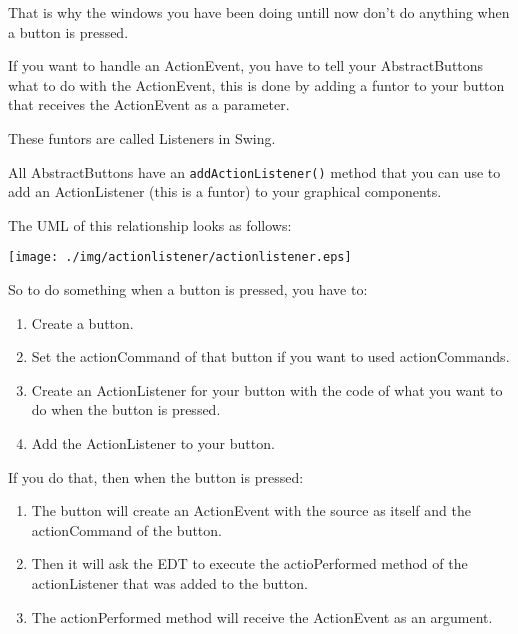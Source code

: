 \documentclass[a4paper, 9pt]{extarticle}
\begin{document}
That is why the windows you have been doing untill now don't do anything when a button is pressed.

If you want to handle an ActionEvent, you have to tell your AbstractButtons
what to do with the ActionEvent, this is done by adding a funtor to your button
that receives the ActionEvent as a parameter.

These funtors are called Listeners in Swing.

All AbstractButtons have an \texttt{addActionListener()} method that you can use to
add an ActionListener (this is a funtor) to your graphical components.

The UML of this relationship looks as follows:

\begin{center}
  \texttt{[image: ./img/actionlistener/actionlistener.eps]}
\end{center}

So to do something when a button is pressed, you have to:

\begin{enumerate}

  \item Create a button.

  \item Set the actionCommand of that button if you want to used actionCommands.

  \item Create an ActionListener for your button with the code of what you want to do when the button is pressed.

  \item Add the ActionListener to your button.

\end{enumerate}

If you do that, then when the button is pressed:

\begin{enumerate}

  \item The button will create an ActionEvent with the source as itself and the actionCommand of the button.

  \item Then it will ask the EDT to execute the actioPerformed method of the actionListener that was added to the button.

  \item The actionPerformed method will receive the ActionEvent as an argument.

\end{enumerate}
\end{document}
